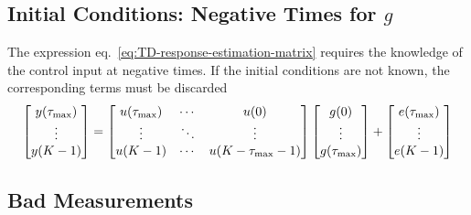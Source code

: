 \subsection{Initial Conditions: Negative Times for $g$}

The expression eq.~\eqref{eq:TD-response-estimation-matrix} requires the knowledge of the control input at negative times. If the initial conditions are not known, the corresponding terms must be discarded
\begin{equation*}
  \begin{bmatrix}
    y(\tau_\text{max}) \\ \vdots \\ y(K-1)
  \end{bmatrix} =
  \begin{bmatrix}
    u(\tau_\text{max}) & \cdots & u(0) \\
    \vdots & \ddots & \vdots \\
    u(K-1) & \cdots & u(K-\tau_\text{max}-1)
  \end{bmatrix}
  \begin{bmatrix}
    g(0) \\ \vdots \\ g(\tau_\text{max})
  \end{bmatrix} +
  \begin{bmatrix}
    e(\tau_\text{max}) \\ \vdots \\ e(K-1)
  \end{bmatrix}
\end{equation*}

\subsection{Bad Measurements}

